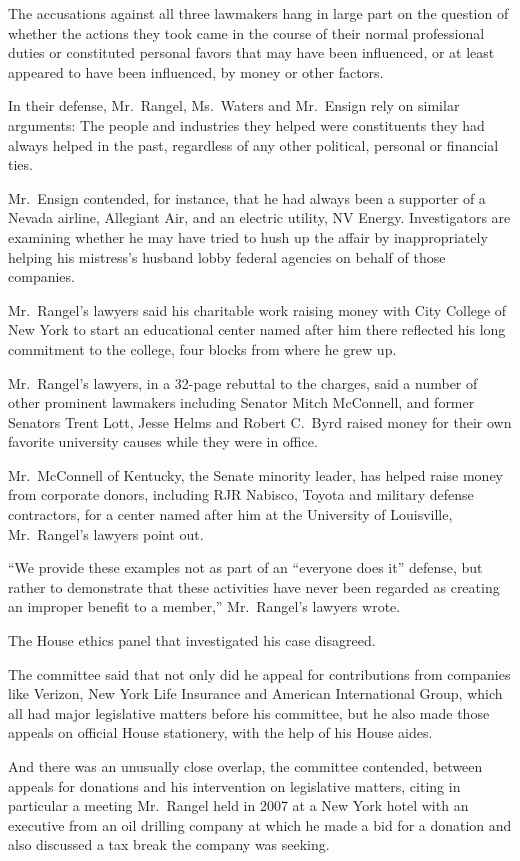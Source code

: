 ﻿\documentclass[12pt]{article}
\begin{document}
The accusations against all three lawmakers hang in large part on the question of whether the
actions they took came in the course of their normal professional duties or constituted personal
favors that may have been influenced, or at least appeared to have been influenced, by money or
other factors.

In their defense, Mr.~Rangel, Ms.~Waters and Mr.~Ensign rely on similar arguments: The people and
industries they helped were constituents they had always helped in the past, regardless of any other
political, personal or financial ties.

Mr.~Ensign contended, for instance, that he had always been a supporter of a Nevada airline,
Allegiant Air, and an electric utility, NV Energy. Investigators are examining whether he may have
tried to hush up the affair by inappropriately helping his mistress's husband lobby federal agencies
on behalf of those companies.

Mr.~Rangel's lawyers said his charitable work raising money with City College of New York to start
an educational center named after him there reflected his long commitment to the college, four
blocks from where he grew up.

Mr.~Rangel's lawyers, in a 32-page rebuttal to the charges, said a number of other prominent
lawmakers including Senator Mitch McConnell, and former Senators Trent Lott, Jesse Helms and Robert
C.~Byrd raised money for their own favorite university causes while they were in office.

Mr.~McConnell of Kentucky, the Senate minority leader, has helped raise money from corporate donors,
including RJR Nabisco, Toyota and military defense contractors, for a center named after him at the
University of Louisville, Mr.~Rangel's lawyers point out.

``We provide these examples not as part of an ``everyone does it'' defense, but rather to
demonstrate that these activities have never been regarded as creating an improper benefit to a
member,'' Mr.~Rangel's lawyers wrote.

The House ethics panel that investigated his case disagreed.

The committee said that not only did he appeal for contributions from companies like Verizon, New
York Life Insurance and American International Group, which all had major legislative matters before
his committee, but he also made those appeals on official House stationery, with the help of his
House aides.

And there was an unusually close overlap, the committee contended, between appeals for donations and
his intervention on legislative matters, citing in particular a meeting Mr.~Rangel held in 2007 at a
New York hotel with an executive from an oil drilling company at which he made a bid for a donation
and also discussed a tax break the company was seeking.
\end{document}
